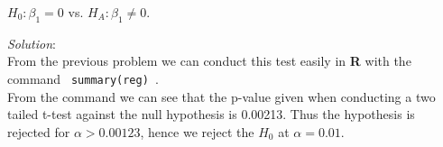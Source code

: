 \documentclass[12pt]{article}
\newcommand{\XB}{\color{black}}
\newcommand{\XBB}{\color{blue}}
\begin{document}
\begin{center}
    $ H_{0} : \beta_{1} = 0 $ vs. $ H_{A} : \beta_{1} \ne 0 $. \\
\end{center} 

\XBB\hrulefill\XB 
\vspace{5mm} 

\vspace{2.5mm} 
\textit{Solution}:
\vspace{2.5mm} \\

\noindent
From the previous problem we can conduct this test easily in \textbf{R} with the command {\XBB \texttt{ summary(reg) }}. \\

\noindent
From the command we can see that the p-value given when conducting a two tailed t-test against the null hypothesis is 0.00213. 
Thus the hypothesis is rejected for $ \alpha > 0.00123 $, hence we reject the $ H_{0} $ at $ \alpha = 0.01 $.  

\vspace{2.5mm}
\end{document}
